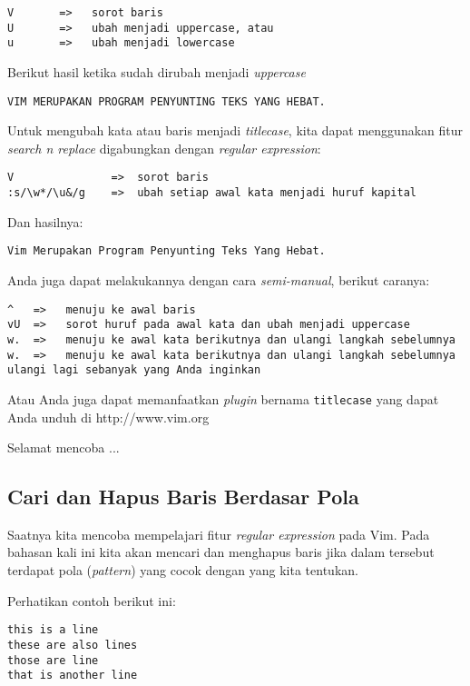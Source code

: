 \documentclass{article}
\begin{document}
\begin{verbatim}
V       =>   sorot baris
U       =>   ubah menjadi uppercase, atau
u       =>   ubah menjadi lowercase
\end{verbatim}

Berikut hasil ketika sudah dirubah menjadi \emph{uppercase}

\begin{verbatim}
VIM MERUPAKAN PROGRAM PENYUNTING TEKS YANG HEBAT.
\end{verbatim}

Untuk mengubah kata atau baris menjadi \emph{titlecase},
kita dapat menggunakan fitur \emph{search n replace}
digabungkan dengan \emph{regular expression}:

\begin{verbatim}
V               =>  sorot baris
:s/\w*/\u&/g    =>  ubah setiap awal kata menjadi huruf kapital
\end{verbatim}

Dan hasilnya:

\begin{verbatim}
Vim Merupakan Program Penyunting Teks Yang Hebat.
\end{verbatim}

Anda juga dapat melakukannya dengan cara \emph{semi-manual},
berikut caranya:

\begin{verbatim}
^   =>   menuju ke awal baris
vU  =>   sorot huruf pada awal kata dan ubah menjadi uppercase
w.  =>   menuju ke awal kata berikutnya dan ulangi langkah sebelumnya
w.  =>   menuju ke awal kata berikutnya dan ulangi langkah sebelumnya
ulangi lagi sebanyak yang Anda inginkan
\end{verbatim}

Atau Anda juga dapat memanfaatkan \emph{plugin} bernama
\verb=titlecase= yang dapat Anda unduh di http://www.vim.org

Selamat mencoba ...

\subsection{Cari dan Hapus Baris Berdasar Pola}
Saatnya kita mencoba mempelajari fitur
\emph{regular expression} pada Vim. Pada bahasan kali ini
kita akan mencari dan menghapus baris jika dalam tersebut
terdapat pola (\emph{pattern}) yang cocok dengan yang kita
tentukan.

Perhatikan contoh berikut ini:

\begin{verbatim}
this is a line
these are also lines
those are line
that is another line
\end{verbatim}
\end{document}
